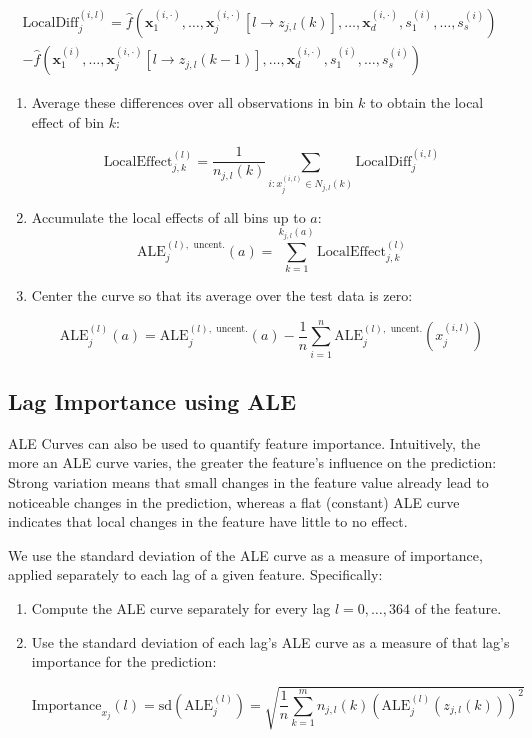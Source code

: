 \documentclass[
]{krantz}
\begin{document}
\begin{align*}
  \text{LocalDiff}_{j}^{(i, l)} = 
  \hat{f}\left(\boldsymbol x_1^{(i, \cdot)}, \dots, \boldsymbol x_j^{(i, \cdot)}[l \to z_{j, l}(k)], \dots, \boldsymbol x_d^{(i, \cdot)}, s_1^{(i)}, \dots, s_s^{(i)}\right) \\
  - \hat{f}\left(\boldsymbol x_1^{(i)}, \dots, \boldsymbol x_j^{(i, \cdot)}[l \to z_{j, l}(k - 1)], \dots, \boldsymbol x_d^{(i, \cdot)}, s_1^{(i)}, \dots, s_s^{(i)}\right)
\end{align*}

\begin{enumerate}
\def\labelenumi{\arabic{enumi}.}
\setcounter{enumi}{1}
\item
  Average these differences over all observations in bin \(k\) to obtain the local effect of bin \(k\):

  \[
  \text{LocalEffect}_{j, k}^{(l)} = \frac{1}{n_{j, l}(k)} \sum_{i : x_j^{(i, l)} \in N_{j, l}(k)} \text{LocalDiff}_j^{(i, l)}
  \]
\item
  Accumulate the local effects of all bins up to \(a\):
  \[
  \mathrm{ALE}_j^{(l), \text{ uncent.}}(a) = \sum_{k=1}^{k_{j, l}(a)} \text{LocalEffect}_{j, k}^{(l)}
  \]
\item
  Center the curve so that its average over the test data is zero:

  \[
  \mathrm{ALE}_j^{(l)}(a) = \mathrm{ALE}_j^{(l), \text{ uncent.}}(a) - \frac{1}{n} \sum_{i=1}^n \mathrm{ALE}_j^{(l), \text{ uncent.}} \left(x_j^{(i, l)}\right)
  \]
\end{enumerate}

\newpage

\subsection{Lag Importance using ALE}\label{lag-importance-using-ale}

ALE Curves can also be used to quantify feature importance. Intuitively, the more an ALE curve varies, the greater the feature's influence on the prediction: Strong variation means that small changes in the feature value already lead to noticeable changes in the prediction, whereas a flat (constant) ALE curve indicates that local changes in the feature have little to no effect.

We use the standard deviation of the ALE curve as a measure of importance, applied separately to each lag of a given feature. Specifically:

\begin{enumerate}
\def\labelenumi{\arabic{enumi}.}
\item
  Compute the ALE curve separately for every lag \(l = 0, \dots, 364\) of the feature.
\item
  Use the standard deviation of each lag's ALE curve as a measure of that lag's importance for the prediction:

  \[
  \mathrm{Importance}_{x_j}(l) = \mathrm{sd}\left(\mathrm{ALE}_j^{(l)}\right) = \sqrt{\frac{1}{n} \sum_{k=1}^m n_{j, l}(k) \left(\mathrm{ALE}_j^{(l)}\left(z_{j, l}(k)\right)\right)^2}
  \]
\end{enumerate}
\end{document}
